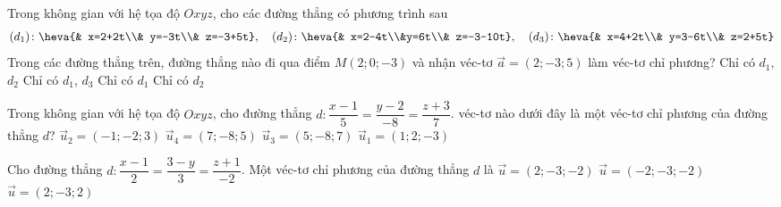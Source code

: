 	\begin{ex}%
	Trong không gian với hệ tọa độ $Oxyz$, cho các đường thẳng có phương trình sau 
	\begin{align*}
	(d_1)\colon\heva{& x=2+2t\\& y=-3t\\& z=-3+5t},
	\quad (d_2)\colon\heva{& x=2-4t\\&y=6t\\& z=-3-10t},
	\quad (d_3)\colon\heva{& x=4+2t\\& y=3-6t\\& z=2+5t}
	\end{align*}
	Trong các đường thẳng trên, đường thẳng nào đi qua điểm $M(2;0;-3)$ và nhận véc-tơ $\overrightarrow{a}=(2;-3;5)$ làm véc-tơ chỉ phương?
	\choice
	{\True Chỉ có $d_1$, $d_2$}
	{Chỉ có $d_1$, $d_3$}
	{Chỉ có $d_1$}
	{Chỉ có $d_2$}
	\end{ex}
	\begin{ex}%
	Trong không gian với hệ tọa độ $Oxyz$, cho đường thẳng $d\colon\dfrac{x-1}{5}=\dfrac{y-2}{-8}=\dfrac{z+3}{7}$. véc-tơ nào dưới đây là một véc-tơ chỉ phương của đường thẳng $d$?
	\choice
	{$\overrightarrow{u}_2=(-1;-2;3)$}
	{$\overrightarrow{u}_4=(7;-8;5)$}
	{\True $\overrightarrow{u}_3=(5;-8;7)$}
	{$\overrightarrow{u}_1=(1;2;-3)$}
	\end{ex}
	\begin{ex}%
	Cho đường thẳng $d\colon \dfrac{x-1}{2}=\dfrac{3-y}{3}=\dfrac{z+1}{-2}$. Một véc-tơ chỉ phương của đường thẳng $d$ là
	{\True $\overrightarrow{u}=(2;-3;-2)$}
	{$\overrightarrow{u}=(-2;-3;-2)$}
	{$\overrightarrow{u}=(2;-3;2)$}
	\end{ex}
